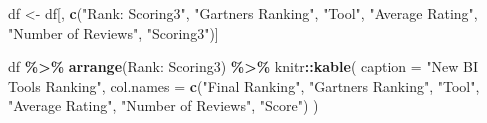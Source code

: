 \documentclass[
]{article}
\newenvironment{Shaded}{\begin{snugshade}}{\end{snugshade}}
\newcommand{\AttributeTok}[1]{\textcolor[rgb]{0.13,0.29,0.53}{#1}}
\newcommand{\FunctionTok}[1]{\textcolor[rgb]{0.13,0.29,0.53}{\textbf{#1}}}
\newcommand{\NormalTok}[1]{#1}
\newcommand{\OtherTok}[1]{\textcolor[rgb]{0.56,0.35,0.01}{#1}}
\newcommand{\SpecialCharTok}[1]{\textcolor[rgb]{0.81,0.36,0.00}{\textbf{#1}}}
\newcommand{\StringTok}[1]{\textcolor[rgb]{0.31,0.60,0.02}{#1}}
\begin{document}
\begin{Shaded}
\begin{Highlighting}[]
\NormalTok{df }\OtherTok{\textless{}{-}}\NormalTok{ df[, }\FunctionTok{c}\NormalTok{(}\StringTok{"Rank: Scoring3"}\NormalTok{, }\StringTok{"Gartner\textquotesingle{}s Ranking"}\NormalTok{, }\StringTok{"Tool"}\NormalTok{, }\StringTok{"Average Rating"}\NormalTok{, }\StringTok{"Number of Reviews"}\NormalTok{, }\StringTok{"Scoring3"}\NormalTok{)]}

\NormalTok{df }\SpecialCharTok{\%\textgreater{}\%}
  \FunctionTok{arrange}\NormalTok{(}\StringTok{\textasciigrave{}}\AttributeTok{Rank: Scoring3}\StringTok{\textasciigrave{}}\NormalTok{) }\SpecialCharTok{\%\textgreater{}\%}
\NormalTok{  knitr}\SpecialCharTok{::}\FunctionTok{kable}\NormalTok{(}
    \AttributeTok{caption =} \StringTok{"New BI Tools Ranking"}\NormalTok{,}
    \AttributeTok{col.names =} \FunctionTok{c}\NormalTok{(}\StringTok{"Final Ranking"}\NormalTok{, }\StringTok{"Gartner\textquotesingle{}s Ranking"}\NormalTok{, }\StringTok{"Tool"}\NormalTok{, }\StringTok{"Average Rating"}\NormalTok{, }\StringTok{"Number of Reviews"}\NormalTok{, }\StringTok{"Score"}\NormalTok{)}
\NormalTok{  )}
\end{Highlighting}
\end{Shaded}
\end{document}
